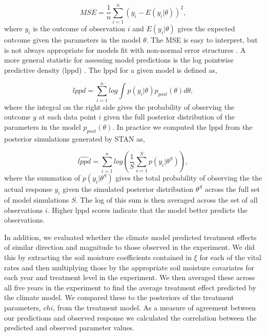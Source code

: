 \documentclass[11pt]{article}
\begin{document}
\begin{doublespacing}
\begin{equation}
MSE = \frac{1}{n} \sum_{i=1}^{n} (y_i - E(y_i|\theta))^2, 
\label{eqn:MSE}
\end{equation}
where $y_i$ is the outcome of observation $i$ and $E(y_i|\theta)$ gives the expected outcome given the parameters in the model $\theta$. The MSE is easy to interpret, but is not always appropriate for models fit with non-normal error structures \citep{gelman_understanding_2014}. A more general statistic for assessing model predictions is the log pointwise predictive density (lppd) \citep{gelman_understanding_2014}.  The lppd for a given model is defined as, 

\begin{equation}
lppd = \sum_{i=1}^{n} log \int p(y_i| \theta)p_{post}(\theta) d\theta, 
\label{eqn:lppd}
\end{equation}
where the integral on the right side gives the probability of observing the outcome $y$ at each data point $i$ given the full posterior distribution of the parameters in the model $p_{post}(\theta)$. In practice we computed the lppd from the posterior simulations generated by STAN as, 

\begin{equation}
\widehat{lppd} = \sum_{i=1}^{n} log \left(\frac{1}{S} \sum_{s=1}^{S} p(y_i | \theta^S) \right),
\label{eqn:clppd}
\end{equation}
where the summation of $p(y_i|\theta^S)$ gives the total probability of observing the the actual response $y_i$ given the simulated posterior distribution $\theta^S$ across the full set of model simulations $S$.  The log of this sum is then averaged across the set of all observations $i$.  Higher lppd scores indicate that the model better predicts the observations.

In addition, we evaluated whether the climate model predicted treatment effects of similar direction and magnitude to those observed in the experiment.  We did this by extracting the soil moisture coefficients contained in $\xi$ for each of the vital rates and then multiplying those by the appropriate soil moisture covariates for each year and treatment level in the experiment.  We then averaged these across all five years in the experiment to find the average treatment effect predicted by the climate model.  We compared these to the posteriors of the treatment parameters, $chi$, from the treatment model.  As a measure of agreement between our predictions and observed response we calculated the correlation between the predicted and observed parameter values. 


\end{doublespacing}
\end{document}
